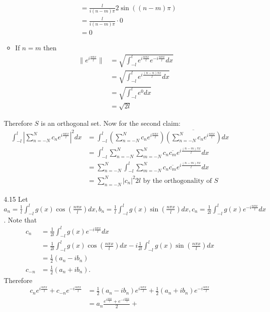 \documentclass[12pt, letterpaper]{article}
\begin{document}
\begin{enumerate}
\begin{itemize}
\begin{align*}
			&= \frac{l}{i(n-m)\pi} 2 \sin((n-m)\pi)\\
			&= \frac{l}{i(n-m)\pi} \cdot 0\\
			&= 0
		\end{align*}
		\item If $n =m $ then 
		\begin{align*}
			\lVert e^{i\frac{n\pi x}{l}} \rVert &= 
			\sqrt{\int_{-l}^l e^{i\frac{n\pi x}{l}} e^{-i\frac{n\pi x}{l}} dx}\\
			&= \sqrt{\int_{-l}^l e^{i\frac{(n-n)\pi x}{l}} dx}\\
			&= \sqrt{\int_{-l}^l e^0 dx}\\
			&= \sqrt{2l}
		\end{align*}
	\end{itemize}
	Therefore $S$ is an orthogonal set.  Now for the second claim:
	\begin{align*}
		\int_{-l}^l |\sum_{n=-N}^N c_n e^{i\frac{n\pi x}{l}}|^2 dx &=
		\int_{-l}^l \left(\sum_{n=-N}^N c_n e^{i\frac{n\pi x}{l}}\right)\overline{\left(\sum_{n=-N}^N c_n e^{i\frac{n\pi x}{l}}\right)} dx\\ &=
		\int_{-l}^l \sum_{n=-N}^N \sum_{m=-N}^N c_n \overline{c_m} e^{i\frac{(n-m)\pi x}{l}} dx\\
		&= \sum_{n=-N}^N \int_{-l}^l \sum_{m=-N}^N c_n \overline{c_m} e^{i\frac{(n-m)\pi x}{l}} dx\\
		&= \sum_{n=-N}^N |c_n|^2 2l \text{ by the orthogonality of } S
	\end{align*}
	\item[4.15] Let $a_n = \frac{1}{l} \int_{-l}^l g(x) \cos(\frac{n \pi  x}{l}) dx,
	b_n = \frac{1}{l} \int_{-l}^l g(x) \sin(\frac{n \pi x}{l}) dx, 
	c_n = \frac{1}{2l} \int_{-l}^l g(x) e^{-i\frac{n \pi x}{l}}dx  $.  
	Note that 
	\begin{align*}
		c_n &= \frac{1}{2l} \int_{-l}^l g(x) e^{-i\frac{n \pi x}{l}}dx \\
		&= \frac{1}{2l} \int_{-l}^l g(x) \cos(\frac{n \pi  x}{l}) dx - i \frac{1}{2l}
		\int_{-l}^l g(x)	\sin(\frac{n \pi x}{l}) dx\\
		&= \frac{1}{2}(a_n - i b_n)\\
		c_{-n} &= \frac{1}{2}(a_n + i b_n).
	\end{align*}
	Therefore  \begin{align*}
		c_n e^{i\frac{n \pi x}{l}} + c_{-n} e^{-i\frac{n \pi x}{l}} &=\frac{1}{2}(a_n - i b_n)e^{i\frac{n \pi x}{l}} + \frac{1}{2}(a_n + i b_n)e^{-i\frac{n \pi x}{l}}\\
		&= a_n \frac{e^{i\frac{n \pi x}{l}} + e^{-i\frac{n \pi x}{l}}}{2} + 

\end{align*}
\end{enumerate}
\end{document}

